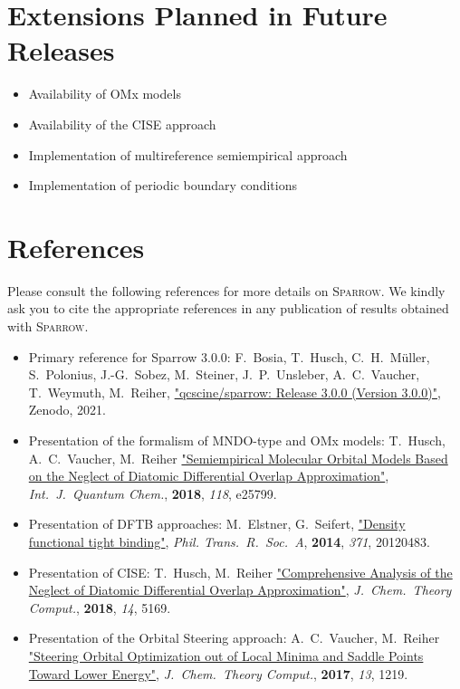 \documentclass[]{tufte-book}
\begin{document}
\chapter{Extensions Planned in Future Releases}
\begin{itemize}
\item Availability of OMx models
\item Availability of the CISE approach
\item Implementation of multireference semiempirical approach
\item Implementation of periodic boundary conditions
\end{itemize}



\chapter{References}

Please consult the following references for more details on \textsc{Sparrow}.
We kindly ask you to cite the appropriate references in any publication of results obtained with \textsc{Sparrow}.
\vspace{1.0cm}

\begin{itemize}
\item Primary reference for Sparrow 3.0.0:
F.~Bosia, T.~Husch, C.~H.~M\"uller, S.~Polonius, J.-G.~Sobez, M.~Steiner, J.~P.~Unsleber, A.~C.~Vaucher, T.~Weymuth, M.~Reiher, \href{https://doi.org/10.5281/zenodo.3244105}{"qcscine/sparrow: Release 3.0.0 (Version 3.0.0)"}, Zenodo, 2021.
\item Presentation of the formalism of MNDO-type and OMx models: \newline
T.~Husch, A.~C.~Vaucher, M.~Reiher \href{https://doi.org/10.1002/qua.25799}{"Semiempirical Molecular Orbital Models Based on the Neglect of Diatomic Differential Overlap Approximation"}, \textit{Int.~J.~Quantum Chem.}, \textbf{2018}, \textit{118}, e25799.
\item Presentation of DFTB approaches: \newline
M.~Elstner, G.~Seifert, \href{https://doi.org/10.1098/rsta.2012.0483}{"Density functional tight binding"}, \textit{Phil. Trans.~R.~Soc.~A}, \textbf{2014}, \textit{371}, 20120483.
\item Presentation of CISE: \newline
T.~Husch, M.~Reiher \href{https://doi.org/10.1021/acs.jctc.8b00601}{"Comprehensive Analysis of the Neglect of Diatomic Differential Overlap Approximation"}, \textit{J.~Chem.~Theory Comput.}, \textbf{2018}, \textit{14}, 5169.
\item Presentation of the Orbital Steering approach: \newline
A.~C.~Vaucher, M.~Reiher
    \href{https://doi.org/10.1021/acs.jctc.7b00011}{"Steering Orbital
    Optimization out of Local Minima and Saddle Points Toward Lower Energy"},
    \textit{J.~Chem.~Theory Comput.}, \textbf{2017}, \textit{13}, 1219.
\end{itemize}





\end{document}
